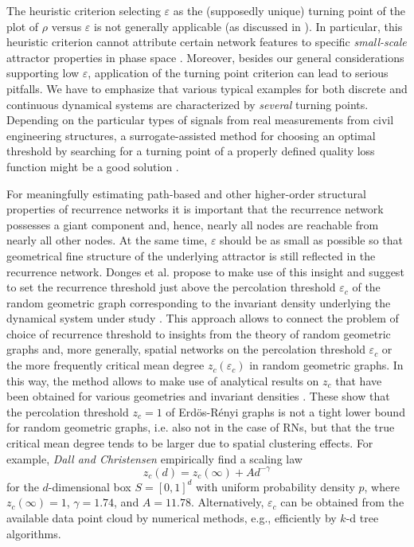 		The heuristic criterion selecting $\varepsilon$ as the (supposedly unique) turning point of the plot of $\rho$ versus $\varepsilon$ \cite{Gao2009} is not generally applicable (as discussed in \cite{Donner2010b}). In particular, this heuristic criterion cannot attribute certain network features to specific \textit{small-scale} attractor properties in phase space \cite{Donner2010b}. Moreover, besides our general considerations supporting low $\varepsilon$, application of the turning point criterion can lead to serious pitfalls. We have to emphasize that various typical examples for both discrete and continuous dynamical systems are characterized by \textit{several} turning points. Depending on the particular types of signals from real measurements from civil engineering structures, a surrogate-assisted method for choosing an optimal threshold by searching for a turning point of a properly defined quality loss function might be a good solution \cite{Yang2015a}.

		For meaningfully estimating path-based and other higher-order structural properties of recurrence networks it is important that the recurrence network possesses a giant component and, hence, nearly all nodes are reachable from nearly all other nodes. At the same time, $\varepsilon$ should be as small as possible so that geometrical fine structure of the underlying attractor is still reflected in the recurrence network. Donges et al. propose to make use of this insight and suggest to set the recurrence threshold just above the percolation threshold $\varepsilon_c$ of the random geometric graph corresponding to the invariant density underlying the dynamical system under study \cite{Donges2012}. This approach allows to connect the problem of choice of recurrence threshold to insights from the theory of random geometric graphs \cite{Dall2002,penrose2003random,herrmann2003connectivity} and, more generally, spatial networks \cite{Gastner2006e,Barthelemy2011,Wiedermann2016} on the percolation threshold $\varepsilon_c$ or the more frequently critical mean degree $z_c(\varepsilon_c)$ in random geometric graphs. In this way, the method allows to make use of analytical results on $z_c$ that have been obtained for various geometries and invariant densities \cite{Dall2002}. These show that the percolation threshold $z_c=1$ of Erd\"os-R\'enyi graphs is not a tight lower bound for random geometric graphs, i.e. also not in the case of RNs, but that the true critical mean degree tends to be larger due to spatial clustering effects. For example, \textit{Dall and Christensen}\cite{Dall2002} empirically find a scaling law
		\begin{equation}
		z_c(d) = z_c(\infty) + A d^{-\gamma}
		\end{equation}
		for the $d$-dimensional box $S=[0,1]^d$ with uniform probability density $p$, where $z_c(\infty) = 1$, $\gamma = 1.74$, and $A = 11.78$. Alternatively, $\varepsilon_c$ can be obtained from the available data point cloud by numerical methods, e.g., efficiently by $k$-d tree algorithms.

